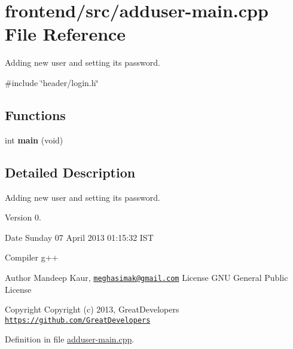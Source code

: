 \hypertarget{adduser-main_8cpp}{\section{frontend/src/adduser-\/main.cpp \-File \-Reference}
\label{adduser-main_8cpp}
}


\-Adding new user and setting its password.  


{\ttfamily \#include \char`\"{}header/login.\-h\char`\"{}}\*
\subsection*{\-Functions}
\begin{DoxyCompactItemize}
\item 
\hypertarget{adduser-main_8cpp_a840291bc02cba5474a4cb46a9b9566fe}{int {\bfseries main} (void)}\label{adduser-main_8cpp_a840291bc02cba5474a4cb46a9b9566fe}

\end{DoxyCompactItemize}


\subsection{\-Detailed \-Description}
\-Adding new user and setting its password. \begin{DoxyVersion}{\-Version}
0. 
\end{DoxyVersion}
\begin{DoxyDate}{\-Date}
\-Sunday 07 \-April 2013 01\-:15\-:32 \-I\-S\-T\par
 \-Compiler g++
\end{DoxyDate}
\begin{DoxyAuthor}{\-Author}
\-Mandeep \-Kaur, \href{mailto:meghasimak@gmail.com}{\tt meghasimak@gmail.\-com} \-License \-G\-N\-U \-General \-Public \-License 
\end{DoxyAuthor}
\begin{DoxyCopyright}{\-Copyright}
\-Copyright (c) 2013, \-Great\-Developers \href{https://github.com/GreatDevelopers}{\tt https\-://github.\-com/\-Great\-Developers} 
\end{DoxyCopyright}


\-Definition in file \hyperlink{adduser-main_8cpp_source}{adduser-\/main.\-cpp}.

